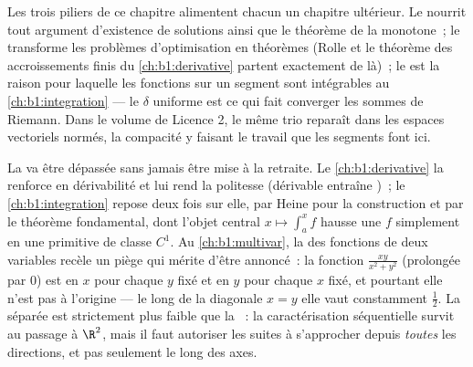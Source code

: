 \begin{remark}
Les trois piliers de ce chapitre alimentent chacun un chapitre
ultérieur. Le  nourrit tout
argument d'existence de solutions ainsi que le théorème de la
 monotone~; le  transforme
les problèmes d'optimisation en théorèmes (Rolle et le théorème
des accroissements finis du \cref{ch:b1:derivative} partent
exactement de là)~; le  est la raison pour
laquelle les fonctions  sur un segment sont intégrables
au \cref{ch:b1:integration} --- le $\delta$ uniforme est ce qui
fait converger les sommes de Riemann. Dans le volume de Licence
2, le même trio reparaît dans les espaces vectoriels normés, la
compacité y faisant le travail que les segments font ici.
\end{remark}

\begin{remark}
La  va être dépassée sans jamais être mise à la
retraite. Le \cref{ch:b1:derivative} la renforce en dérivabilité
et lui rend la politesse (dérivable entraîne )~; le
\cref{ch:b1:integration} repose deux fois sur elle, par Heine
pour la construction et par le théorème fondamental, dont l'objet
central $x \mapsto \int_a^x f$ hausse une $f$ simplement 
en une primitive de classe $C^1$. Au
\cref{ch:b1:multivar}, la  des fonctions de deux
variables recèle un piège qui mérite d'être annoncé~: la fonction $\frac{xy}{x^2 +
y^2}$ (prolongée par $0$) est  en $x$ pour chaque $y$
fixé et en $y$ pour chaque $x$ fixé, et pourtant elle n'est pas
 à l'origine --- le long de la diagonale $x = y$ elle vaut
constamment $\frac12$. La  séparée est strictement plus
faible que la ~: la caractérisation séquentielle
survit au passage à $\R^2$, mais il faut autoriser les suites à
s'approcher depuis \emph{toutes} les directions, et pas seulement
le long des axes.
\end{remark}

